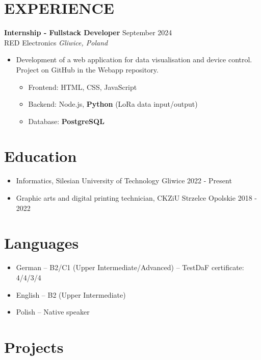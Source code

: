 \documentclass[11pt,letterpaper]{article}
\newcommand{\spacedSection}[1]{
  \vspace{0.1em}
  \section{#1}
  \vspace{1em}
}
\begin{document}
\vspace{1em}
\spacedSection{EXPERIENCE}

\textbf{Internship - Fullstack Developer} \hfill September 2024 \\ [0.4em]
RED Electronics \hfill \textit{Gliwice, Poland}
\begin{itemize}[leftmargin=0.5cm]
\itemsep-3pt {}
    \item Development of a web application for data visualisation and device control. 
    Project on GitHub in the Webapp repository.
    \begin{itemize}[leftmargin=0.5cm]
      \itemsep-3pt {}
          \item Frontend: HTML, CSS, JavaScript
          \item Backend: Node.js, \textbf{Python} (LoRa data input/output)
          \item Database: \textbf{PostgreSQL} 
      \end{itemize}
\end{itemize}

\spacedSection{Education}
  
\begin{itemize}[leftmargin=0.5cm]
  \itemsep-3pt {}
      \item Informatics, Silesian University of Technology Gliwice \hfill {2022 - Present}
      \item Graphic arts and digital printing technician, CKZiU Strzelce Opolskie \hfill {2018 - 2022}
\end{itemize}

\spacedSection{Languages}
  
\begin{itemize}[leftmargin=0.5cm]
  \itemsep-3pt {}
    \item German – B2/C1 (Upper Intermediate/Advanced) – TestDaF certificate: 4/4/3/4
    \item English – B2 (Upper Intermediate)
    \item Polish – Native speaker
\end{itemize}

\spacedSection{Projects}
\end{document}
